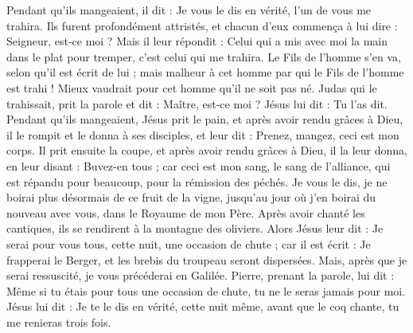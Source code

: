 \begin{multicols}{2}
Pendant qu’ils mangeaient, il dit : Je vous le dis en vérité, l'un de vous me trahira.
Ils furent profondément attristés, et chacun d'eux commença à lui dire : Seigneur, est-ce moi ?
Mais il leur répondit : Celui qui a mis avec moi la main dans le plat pour tremper, c'est celui qui me trahira.
Le Fils de l'homme s'en va, selon qu'il est écrit de lui ; mais malheur à cet homme par qui le Fils de l'homme est trahi ! Mieux vaudrait pour cet homme qu’il ne soit pas né.
Judas qui le trahissait, prit la parole et dit : Maître, est-ce moi ? Jésus lui dit : Tu l'as dit.
Pendant qu’ils mangeaient, Jésus prit le pain, et après avoir rendu grâces à Dieu, il le rompit et le donna à ses disciples, et leur dit : Prenez, mangez, ceci est mon corps.
Il prit ensuite la coupe, et après avoir rendu grâces à Dieu, il la leur donna, en leur disant : Buvez-en tous ;
car ceci est mon sang, le sang de l’alliance, qui est répandu pour beaucoup, pour la rémission des péchés.
Je vous le dis, je ne boirai plus désormais de ce fruit de la vigne, jusqu'au jour où j’en boirai du nouveau avec vous, dans le Royaume de mon Père.
Après avoir chanté les cantiques{}, ils se rendirent à la montagne des oliviers.
Alors Jésus leur dit : Je serai pour vous tous, cette nuit, une occasion de chute ; car il est écrit : Je frapperai le Berger, et les brebis du troupeau seront dispersées{}.
Mais, après que je serai ressuscité, je vous précéderai en Galilée.
Pierre, prenant la parole, lui dit : Même si tu étais pour tous une occasion de chute, tu ne le seras jamais pour moi.
Jésus lui dit : Je te le dis en vérité, cette nuit même, avant que le coq chante, tu me renieras trois fois.

\end{multicols}
